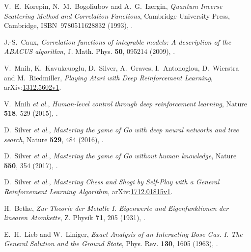 \documentclass[11pt, a4paper]{report} %
\begin{document}
\begin{thebibliography}{99}


V.~E.~Korepin, N.~M.~Bogoliubov and A.~G.~Izergin, \textit{Quantum Inverse Scattering Method and Correlation Functions}, Cambridge University Press, Cambridge, ISBN~9780511628832 (1993), .




J.-S.~Caux, \textit{Correlation functions of integrable models: A description of the ABACUS algorithm}, J. Math. Phys. \textbf{50}, 095214 (2009), .




V.~Mnih, K.~Kavukcuoglu, D.~Silver, A.~Graves, I.~Antonoglou, D.~Wierstra and M.~Riedmiller, \textit{Playing Atari with Deep Reinforcement Learning}, arXiv:\href{https://arxiv.org/abs/1312.5602v1}{1312.5602v1}. 




V.~Mnih \textit{et al.}, \textit{Human-level control through deep reinforcement learning}, Nature \textbf{518}, 529 (2015), .




D.~Silver \textit{et al.}, \textit{Mastering the game of Go with deep neural networks and tree search}, Nature \textbf{529}, 484 (2016), .




D.~Silver \textit{et al.}, \textit{Mastering the game of Go without human knowledge}, Nature \textbf{550}, 354 (2017), .




D.~Silver \textit{et al.}, \textit{Mastering Chess and Shogi by Self-Play with a General Reinforcement Learning Algorithm}, arXiv:\href{https://arxiv.org/abs/1712.01815v1}{1712.01815v1}. 




H.~Bethe, \textit{Zur Theorie der Metalle I. Eigenwerte und Eigenfunktionen der linearen Atomkette}, Z. Physik \textbf{71}, 205 (1931), .




E.~H.~Lieb and W.~Liniger, \textit{Exact Analysis of an Interacting Bose Gas. I. The General Solution and the Ground State}, Phys. Rev. \textbf{130}, 1605 (1963), .





\end{thebibliography}
\end{document}
